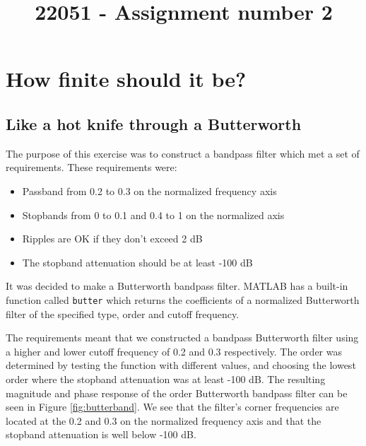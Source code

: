 \documentclass[journal]{IEEEtran}
\begin{document}
\title{22051 - Assignment number 2}
\author{\vspace{-10mm}}

\maketitle

\section{How finite should it be?}

\subsection{Like a hot knife through a Butterworth}
The purpose of this exercise was to construct a bandpass filter which met a set of requirements. These requirements were:
\begin{itemize}
\item Passband from 0.2 to 0.3 on the normalized frequency axis
\item Stopbands from 0 to 0.1 and 0.4 to 1 on the normalized axis
\item Ripples are OK if they don't exceed 2 dB
\item The stopband attenuation should be at least -100 dB
\end{itemize}

It was decided to make a Butterworth bandpass filter. MATLAB has a built-in function called \texttt{butter} which returns the coefficients of a normalized Butterworth filter of the specified type, order and cutoff frequency. 

The requirements meant that we constructed a bandpass Butterworth filter using a higher and lower cutoff frequency of 0.2 and 0.3 respectively. The order was determined by testing the function with different values, and choosing the lowest order where the stopband attenuation was at least -100 dB. The resulting magnitude and phase response of the  order Butterworth bandpass filter can be seen in Figure \ref{fig:butterband}. We see that the filter's corner frequencies are located at the 0.2 and 0.3 on the normalized frequency axis and that the stopband attenuation is well below -100 dB. 
\end{document}
